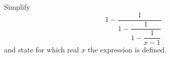 Simplify
\[
1-\dfrac{1}{1-\dfrac{1}{1-\dfrac{1}{x-1}}}
\]
and state for which real $x$ the expression is defined.
